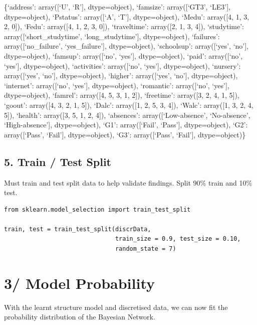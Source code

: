 \documentclass[
]{article}
\begin{document}
\{`address': array({[}`U', `R'{]}, dtype=object), `famsize':
array({[}`GT3', `LE3'{]}, dtype=object), `Pstatus': array({[}`A',
`T'{]}, dtype=object), `Medu': array({[}4, 1, 3, 2, 0{]}), `Fedu':
array({[}4, 1, 2, 3, 0{]}), `traveltime': array({[}2, 1, 3, 4{]}),
`studytime': array({[}`short\_studytime', `long\_studytime'{]},
dtype=object), `failures': array({[}`no\_failure', `yes\_failure'{]},
dtype=object), `schoolsup': array({[}`yes', `no'{]}, dtype=object),
`famsup': array({[}`no', `yes'{]}, dtype=object), `paid': array({[}`no',
`yes'{]}, dtype=object), `activities': array({[}`no', `yes'{]},
dtype=object), `nursery': array({[}`yes', `no'{]}, dtype=object),
`higher': array({[}`yes', `no'{]}, dtype=object), `internet':
array({[}`no', `yes'{]}, dtype=object), `romantic': array({[}`no',
`yes'{]}, dtype=object), `famrel': array({[}4, 5, 3, 1, 2{]}),
`freetime': array({[}3, 2, 4, 1, 5{]}), `goout': array({[}4, 3, 2, 1,
5{]}), `Dalc': array({[}1, 2, 5, 3, 4{]}), `Walc': array({[}1, 3, 2, 4,
5{]}), `health': array({[}3, 5, 1, 2, 4{]}), `absences':
array({[}`Low-absence', `No-absence', `High-absence'{]}, dtype=object),
`G1': array({[}`Fail', `Pass'{]}, dtype=object), `G2': array({[}`Pass',
`Fail'{]}, dtype=object), `G3': array({[}`Pass', `Fail'{]},
dtype=object)\}

\hypertarget{train-test-split}{%
\subsection{5. Train / Test Split}\label{train-test-split}}

Must train and test split data to help validate findings. Split 90\%
train and 10\% test.

\begin{verbatim}
from sklearn.model_selection import train_test_split

train, test = train_test_split(discrData,
                               train_size = 0.9, test_size = 0.10,
                               random_state = 7)
\end{verbatim}

\hypertarget{model-probability}{%
\section{3/ Model Probability}\label{model-probability}}

With the learnt structure model and discretised data, we can now fit the
probability distribution of the Bayesian Network.
\end{document}
